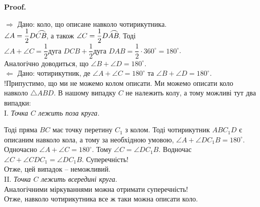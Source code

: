 \documentclass[a4paper, 10pt]{article}
\makeatletter
\def\rightproof{$\boxed{\Rightarrow}$ }
\def\leftproof{$\boxed{\Leftarrow}$ }
\def\qed{$\blacksquare$}
\theoremstyle{theoremdd}
\theoremstyle{theoremdd}
\theoremstyle{theoremdd}
\theoremstyle{theoremdd}
\theoremstyle{theoremdd}
\theoremstyle{theoremdd}
\theoremstyle{theoremdd}
\theoremstyle{theoremdd}
\theoremstyle{theoremdd}
\renewenvironment{proof}[1][Proof.\\]{\par
\pushQED{\hfill \qed}%
\normalfont \topsep6\p@\@plus6\p@\relax
\trivlist
\item\relax
{\bfseries
#1\@addpunct{.}}\hspace\labelsep\ignorespaces
}{%
\popQED\endtrivlist\@endpefalse
}
\newcommand{\tarc}{\mbox{\large$\frown$}}
\newcommand{\arc}[2][-3ex]{{#2}{\kern #1{\raisebox{1.5ex}{\tarc}}}}
\makeatother
\begin{document}
\begin{proof}
\rightproof Дано: коло, що описане навколо чотирикутника.\\
$\angle A = \dfrac{1}{2} \arc{DCB}$, а також $\angle C = \dfrac{1}{2} \arc{DAB}$. Тоді\\
$\angle A + \angle C = \dfrac{1}{2} \text{дуга } DCB + \dfrac{1}{2} \text{дуга } DAB = \dfrac{1}{2} \cdot 360^\circ = 180^\circ$.\\
Аналогічно доводиться, що $\angle B + \angle D = 180^\circ$.
\bigskip \\
\leftproof Дано: чотирикутник, де $\angle A + \angle C = 180^\circ$ та $\angle B + \angle D = 180^\circ$.\\
!Припустимо, що ми не можемо колом описати. Ми можемо описати коло навколо $\triangle ABD$. В нашому випадку $C$ не належить колу, а тому можливі тут два випадки:\\
I. \textit{Точка $C$ лежить поза круга}.
\begin{figure}[H]
\centering
{}
\end{figure}
Тоді пряма $BC$ має точку перетину $C_1$ з колом. Тоді чотирикутник $ABC_1D$ є описаним навколо кола, а тому за необхідною умовою, $\angle A + \angle DC_1B = 180^\circ$. Одночасно $\angle A + \angle C = 180^\circ$. Тому $\angle C = \angle DC_1B$. Водночас $\angle C + \angle CDC_1 = \angle DC_1B$. Суперечність!\\
Отже, цей випадок -- неможливий.
\bigskip \\
II. \textit{Точка $C$ лежить всередині круга}.\\
Аналогічними міркуваннями можна отримати суперечність!\\
Отже, навколо чотирикутника все ж таки можна описати коло.
\end{proof}
\end{document}
